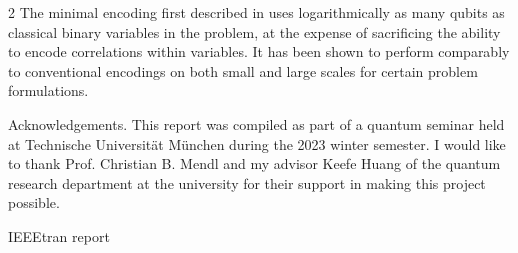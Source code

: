 \documentclass [10pt]{article}
\begin{document}
\begin {multicols}{2}
The minimal encoding first described in \cite{effbinopt} uses logarithmically
as many qubits as classical binary variables in the problem, at the expense of
sacrificing the ability to encode correlations within variables. It has been
shown \cite{effvrp} to perform comparably to conventional encodings on both
small and large scales for certain problem formulations.

Acknowledgements. This report was compiled as part of a quantum seminar held
at Technische Universität München during the 2023 winter semester. I would
like to thank Prof. Christian B. Mendl and my advisor Keefe Huang of the 
quantum research department at the university for their support in making
this project possible.

 {IEEEtran}
 {report}

\appendix

\end {multicols}
\end{document}
